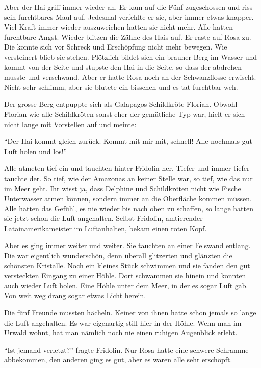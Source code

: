 Aber der Hai griff immer wieder an. Er kam auf die Fünf zugeschossen und riss sein furchtbares Maul auf. Jedesmal verfehlte er sie, aber immer etwas knapper. Viel Kraft immer wieder auszuweichen hatten sie nicht mehr. Alle hatten furchtbare Angst. Wieder blitzen die Zähne des Hais auf. Er raste auf Rosa zu. Die konnte sich vor Schreck und Erschöpfung nicht mehr bewegen. Wie versteinert blieb sie stehen. Plötzlich bildet sich ein brauner Berg im Wasser und kommt von der Seite und stupste den Hai in die Seite, so dass der abdrehen musste und verschwand. Aber er hatte Rosa noch an der Schwanzflosse erwischt. Nicht sehr schlimm, aber sie blutete ein bisschen und es tat furchtbar weh.

Der grosse Berg entpuppte sich als Galapagos-Schildkröte Florian. Obwohl Florian wie alle Schildkröten sonst eher der gemütliche Typ war, hielt er sich nicht lange mit Vorstellen auf und meinte: 

\enquote{Der Hai kommt gleich zurück. Kommt mit mir mit, schnell! Alle nochmals gut Luft holen und los!}

Alle atmeten tief ein und tauchten hinter Fridolin her. Tiefer und immer tiefer tauchte der. So tief, wie der Amazonas an keiner Stelle war, so tief, wie das nur im Meer geht. Ihr wisst ja, dass Delphine und Schildkröten nicht wie Fische Unterwasser atmen können, sondern immer an die Oberfläche kommen müssen. Alle hatten das Gefühl, es nie wieder bis nach oben zu schaffen, so lange hatten sie jetzt schon die Luft angehalten. Selbst Fridolin, amtierender Latainamerikameister im Luftanhalten, bekam einen roten Kopf.

Aber es ging immer weiter und weiter. Sie tauchten an einer Felswand entlang. Die war eigentlich wunderschön, denn überall glitzerten und glänzten die schönsten Kristalle. Noch ein kleines Stück schwimmen und sie fanden den gut versteckten Eingang zu einer Höhle. Dort schwammen sie hinein und konnten auch wieder Luft holen. Eine Höhle unter dem Meer, in der es sogar Luft gab. Von weit weg drang sogar etwas Licht herein.

Die fünf Freunde mussten hächeln. Keiner von ihnen hatte schon jemals so lange die Luft angehalten. Es war eigenartig still hier in der Höhle. Wenn man im Urwald wohnt, hat man nämlich noch nie einen ruhigen Augenblick erlebt.

\enquote{Ist jemand verletzt?} fragte Fridolin. Nur Rosa hatte eine schwere Schramme abbekommen, den anderen ging es gut, aber es waren alle sehr erschöpft.

